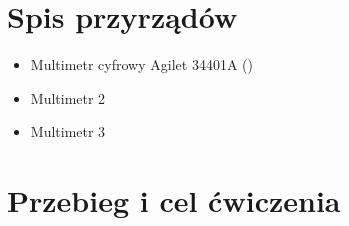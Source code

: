 {\section*{Spis przyrządów}}

\begin{itemize}
    \item Multimetr cyfrowy Agilet 34401A ()
    \item Multimetr 2
    \item Multimetr 3
\end{itemize}

{\section*{Przebieg i cel ćwiczenia}}